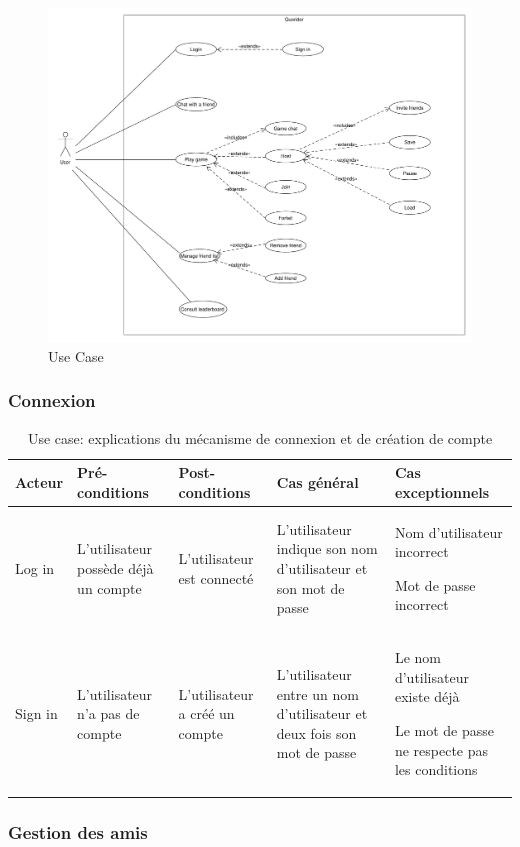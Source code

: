 \documentclass[a4paper,10pt]{article}
\begin{document}
\begin{figure}[H]
    \centering
   
	\includegraphics[width=5in]{use/main.pdf}
	\caption{Use Case}
	
	
\end{figure}

\subsubsection{Connexion}
\noindent
\begin{table}[H]
\begin{tabular}{|p{3cm}|p{3cm}|p{3cm}|p{3cm}|p{3cm}|}
\hline
	\textbf{Acteur} & \textbf{Pré-conditions} & \textbf{Post-conditions} & \textbf{Cas général}& \textbf{Cas exceptionnels} \\
\hline
	Log in & L'utilisateur possède déjà un compte & L'utilisateur est connecté & L'utilisateur indique son nom d'utilisateur et son mot de passe& Nom d'utilisateur incorrect

	Mot de passe incorrect \\
\hline
	Sign in & L'utilisateur n'a pas de compte & L'utilisateur a créé un compte & L'utilisateur entre un nom d'utilisateur et deux fois son mot de passe& Le nom d'utilisateur existe déjà

Le mot de passe ne respecte pas les conditions\\
\hline
\end{tabular}
	\caption{Use case: explications du mécanisme de connexion et de création de compte}
\end{table}
\subsubsection{Gestion des amis}
\noindent
\end{document}
